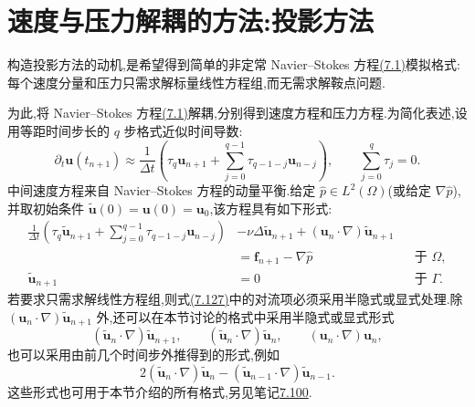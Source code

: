 \section{速度与压力解耦的方法:投影方法}
\label{sec:projection-methods}

\begin{note}[动机与基本思想]\label{note:projection-methods-motivation}
构造投影方法的动机,是希望得到简单的非定常 Navier--Stokes 方程\hyperref[eq:time-dependent-ns-strong]{(7.1)}模拟格式:每个速度分量和压力只需求解标量线性方程组,而无需求解鞍点问题.

为此,将 Navier--Stokes 方程\hyperref[eq:time-dependent-ns-strong]{(7.1)}解耦,分别得到速度方程和压力方程.为简化表述,设用等距时间步长的 $q$ 步格式近似时间导数:
\begin{equation}\label{eq:projection-q-step-time-derivative}
\partial_t\bm{u}(t_{n+1})
\approx \frac1{\Delta t}
\left(\tau_q\bm{u}_{n+1}
  +\sum_{j=0}^{q-1}\tau_{q-1-j}\bm{u}_{n-j}\right),
\qquad
\sum_{j=0}^{q}\tau_j=0.
\end{equation}
中间速度方程来自 Navier--Stokes 方程的动量平衡.给定
$\widehat p\in L^2(\Omega)$(或给定 $\nabla\widehat p$),并取初始条件
$\widetilde{\bm{u}}(0)=\bm{u}(0)=\bm{u}_0$,该方程具有如下形式:
\begin{equation}\label{eq:projection-intermediate-velocity}
\begin{aligned}
 \frac1{\Delta t}\left(
   \tau_q\widetilde{\bm{u}}_{n+1}
   +\sum_{j=0}^{q-1}\tau_{q-1-j}\bm{u}_{n-j}\right)
 &-\nu\Delta\widetilde{\bm{u}}_{n+1}
   +(\bm{u}_n\cdot\nabla)\widetilde{\bm{u}}_{n+1}\\
 &=\bm{f}_{n+1}-\nabla\widehat p
   &&\text{于 }\Omega,\\
 \widetilde{\bm{u}}_{n+1}&=0
   &&\text{于 }\Gamma.
\end{aligned}
\end{equation}
若要求只需求解线性方程组,则式\hyperref[eq:projection-intermediate-velocity]{(7.127)}中的对流项必须采用半隐式或显式处理.除 $(\bm{u}_n\cdot\nabla)\widetilde{\bm{u}}_{n+1}$ 外,还可以在本节讨论的格式中采用半隐式或显式形式
\[
(\widetilde{\bm{u}}_n\cdot\nabla)\widetilde{\bm{u}}_{n+1},
\qquad
(\widetilde{\bm{u}}_n\cdot\nabla)\widetilde{\bm{u}}_n,
\qquad
(\bm{u}_n\cdot\nabla)\bm{u}_n,
\]
也可以采用由前几个时间步外推得到的形式,例如
\begin{equation}\label{eq:projection-convection-extrapolation}
2(\widetilde{\bm{u}}_n\cdot\nabla)\widetilde{\bm{u}}_n
-(\widetilde{\bm{u}}_{n-1}\cdot\nabla)\widetilde{\bm{u}}_{n-1}.
\end{equation}
这些形式也可用于本节介绍的所有格式,另见笔记\hyperref[note:projection-methods-later-remarks]{7.100}.


\end{note}
